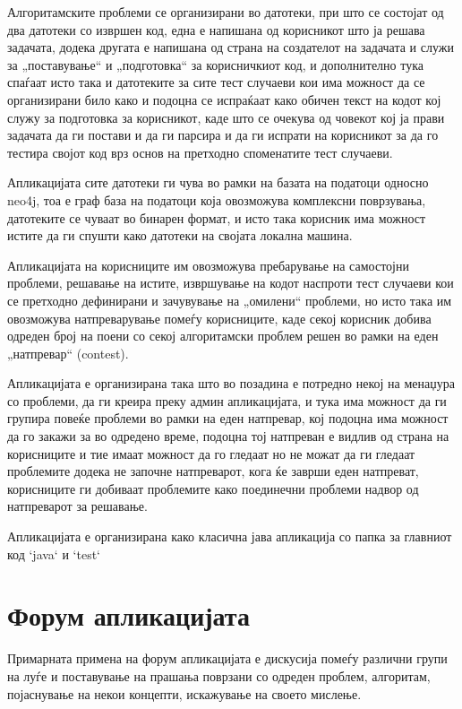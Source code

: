 \documentclass{article}
\begin{document}
Алгоритамските проблеми се организирани во датотеки, при што се состојат од два датотеки со извршен код, една е напишана од корисникот што ја решава задачата, додека другата е напишана од страна на создателот на задачата и служи за „поставување“ и „подготовка“ за корисничкиот код, и дополнително тука спаѓаат исто така и датотеките за сите тест случаеви кои има можност да се организирани било како и подоцна се испраќаат како обичен текст на кодот кој служу за подготовка за корисникот, каде што се очекува од човекот кој ја прави задачата да ги постави и да ги парсира и да ги испрати на корисникот за да го тестира својот код врз основ на претходно споменатите тест случаеви.

Апликацијата сите датотеки ги чува во рамки на базата на податоци односно neo4j, тоа е граф база на податоци која овозможува комплексни поврзувања, датотеките се чуваат во бинарен формат, и исто така корисник има можност истите да ги спушти како датотеки на својата локална машина.

Апликацијата на корисниците им овозможува пребарување на самостојни проблеми, решавање на истите, извршување на кодот наспроти тест случаеви кои се претходно дефинирани и зачувување на „омилени“ проблеми, но исто така им овозможува натпреварување помеѓу корисниците, каде секој корисник добива одреден број на поени со секој алгоритамски проблем решен во рамки на еден „натпревар“ (contest).

Апликацијата е организирана така што во позадина е потредно некој на менаџура со проблеми, да ги креира преку админ апликацијата, и тука има можност да ги групира повеќе проблеми во рамки на еден натпревар, кој подоцна има можност да го закажи за во одредено време, подоцна тој натпреван е видлив од страна на корисниците и тие имаат можност да го гледаат но не можат да ги гледаат проблемите додека не започне натпреварот, кога ќе заврши еден натпреват, корисниците ги добиваат проблемите како поединечни проблеми надвор од натпреварот за решавање.

Апликацијата е организирана како класична јава апликација со папка за главниот код `java` и `test`
\section{Форум апликацијата}

Примарната примена на форум апликацијата е дискусија помеѓу различни групи на луѓе и поставување на прашања поврзани со одреден проблем, алгоритам, појаснување на некои концепти, искажување на своето мислење.
\end{document}
